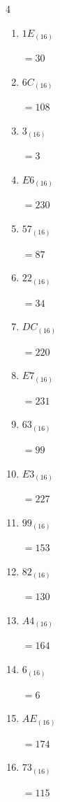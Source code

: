 \begin{multicols}{4}
\begin{enumerate}
  \item $1E_{(16)}$

        $=30$

\columnbreak %

  \item $6C_{(16)}$

        $=108$

  \item $3_{(16)}$

        $=3$

  \item $E6_{(16)}$

        $=230$

  \item $57_{(16)}$

        $=87$

  \item $22_{(16)}$

        $=34$

  \item $DC_{(16)}$

        $=220$

  \item $E7_{(16)}$

        $=231$

  \item $63_{(16)}$

        $=99$

  \item $E3_{(16)}$

        $=227$

  \item $99_{(16)}$

        $=153$

  \item $82_{(16)}$

        $=130$

  \item $A4_{(16)}$

        $=164$

  \item $6_{(16)}$

        $=6$

  \item $AE_{(16)}$

        $=174$

  \item $73_{(16)}$

        $=115$

\columnbreak %


\end{enumerate}
\end{multicols}
